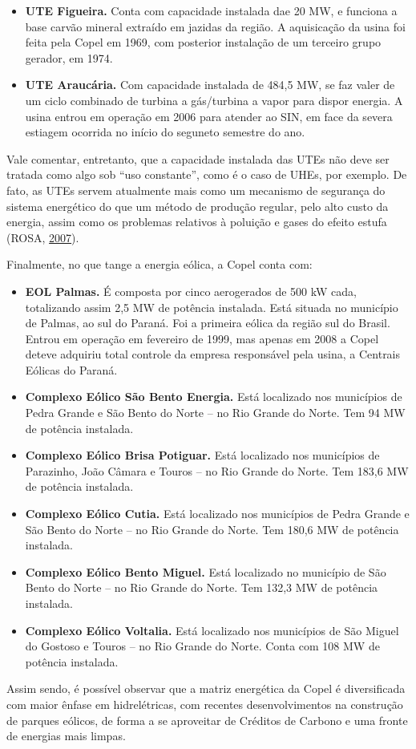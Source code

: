 \documentclass[grad,numbers]{coppe}
\providecommand{\tightlist}{%
  \setlength{\itemsep}{0pt}\setlength{\parskip}{0pt}}
\begin{document}
  \begin{itemize}
  \tightlist
  \item
    \textbf{UTE Figueira.} Conta com capacidade instalada dae 20 MW, e funciona a base carvão mineral extraído em jazidas da região. A aquisicação da usina foi feita pela Copel em 1969, com posterior instalação de um terceiro grupo gerador, em 1974.
  \item
    \textbf{UTE Araucária.} Com capacidade instalada de 484,5 MW, se faz valer de um ciclo combinado de turbina a gás/turbina a vapor para dispor energia. A usina entrou em operação em 2006 para atender ao SIN, em face da severa estiagem ocorrida no início do seguneto semestre do ano.
  \end{itemize}
  Vale comentar, entretanto, que a capacidade instalada das UTEs não deve ser tratada como algo sob ``uso constante'', como é o caso de UHEs, por exemplo. De fato, as UTEs servem atualmente mais como um mecanismo de segurança do sistema energético do que um método de produção regular, pelo alto custo da energia, assim como os problemas relativos à poluição e gases do efeito estufa (ROSA, \protect\hyperlink{ref-rosa2007}{2007}).

  Finalmente, no que tange a energia eólica, a Copel conta com:
  \begin{itemize}
  \tightlist
  \item
    \textbf{EOL Palmas.} É composta por cinco aerogerados de 500 kW cada, totalizando assim 2,5 MW de potência instalada. Está situada no município de Palmas, ao sul do Paraná. Foi a primeira eólica da região sul do Brasil. Entrou em operação em fevereiro de 1999, mas apenas em 2008 a Copel deteve adquiriu total controle da empresa responsável pela usina, a Centrais Eólicas do Paraná.
  \item
    \textbf{Complexo Eólico São Bento Energia.} Está localizado nos municípios de Pedra Grande e São Bento do Norte -- no Rio Grande do Norte. Tem 94 MW de potência instalada.
  \item
    \textbf{Complexo Eólico Brisa Potiguar.} Está localizado nos municípios de Parazinho, João Câmara e Touros -- no Rio Grande do Norte. Tem 183,6 MW de potência instalada.
  \item
    \textbf{Complexo Eólico Cutia.} Está localizado nos municípios de Pedra Grande e São Bento do Norte -- no Rio Grande do Norte. Tem 180,6 MW de potência instalada.
  \item
    \textbf{Complexo Eólico Bento Miguel.} Está localizado no município de São Bento do Norte -- no Rio Grande do Norte. Tem 132,3 MW de potência instalada.
  \item
    \textbf{Complexo Eólico Voltalia.} Está localizado nos municípios de São Miguel do Gostoso e Touros -- no Rio Grande do Norte. Conta com 108 MW de potência instalada.
  \end{itemize}
  Assim sendo, é possível observar que a matriz energética da Copel é diversificada com maior ênfase em hidrelétricas, com recentes desenvolvimentos na construção de parques eólicos, de forma a se aproveitar de Créditos de Carbono e uma fronte de energias mais limpas.
\end{document}
